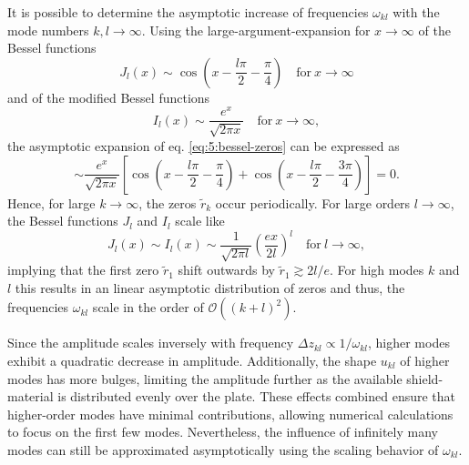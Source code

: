 It is possible to determine the asymptotic increase of frequencies $\omega_{kl}$ with the mode numbers $k,l \rightarrow \infty$.
Using the large-argument-expansion for $x\rightarrow\infty$ of the Bessel functions \cite[eq. 10.17.3]{DLMF}
\begin{equation}
  J_l(x) \sim \cos(x - \frac{l \pi}{2} - \frac{\pi}{4}) \quad \text{for} \ x \rightarrow \infty
\end{equation}
and of the modified Bessel functions \cite[eq. 10.40.1]{DLMF}
\begin{equation}
  I_l(x) \sim \frac{e^x}{\sqrt{2\pi x}} \quad \text{for} \ x \rightarrow \infty,
\end{equation}
the asymptotic expansion of eq. \eqref{eq:5:bessel-zeros} can be expressed as
\begin{equation}
  \sim \frac{e^x}{\sqrt{2\pi x}} \left[\cos(x - \frac{l \pi}{2} - \frac{\pi}{4}) + \cos(x - \frac{l \pi}{2} - \frac{3 \pi}{4})\right] = 0 .
\end{equation}
Hence, for large $k\rightarrow\infty$, the zeros $\tilde{r}_k$ occur periodically.
For large orders $l\rightarrow \infty$, the Bessel functions $J_l$ and $I_l$ scale like \cite[eq. 10.19.1 and eq. 10.41.1]{DLMF}
\begin{equation}
  J_l(x) \sim I_l(x) \sim \frac{1}{\sqrt{2\pi l}} \left(\frac{ex}{2l}\right)^l \quad \text{for} \ l \rightarrow \infty ,
\end{equation}
implying that the first zero $\tilde{r}_1$ shift outwards by $\tilde{r}_1 \gtrsim 2l/e$.
For high modes $k$ and $l$ this results in an linear asymptotic distribution of zeros and thus, the frequencies $\omega_{kl}$ scale in the order of $\mathcal{O}((k + l)^2)$.

Since the amplitude scales inversely with frequency $\Delta z_{kl} \propto 1/\omega_{kl}$, higher modes exhibit a quadratic decrease in amplitude.
Additionally, the shape $u_{kl}$ of higher modes has more bulges, limiting the amplitude further as the available shield-material is distributed evenly over the plate.
These effects combined ensure that higher-order modes have minimal contributions, allowing numerical calculations to focus on the first few modes.
Nevertheless, the influence of infinitely many modes can still be approximated asymptotically using the scaling behavior of $\omega_{kl}$.